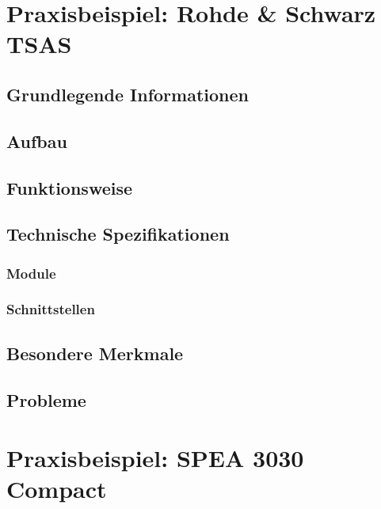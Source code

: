             
            \noindent

\section{Praxisbeispiel: Rohde \& Schwarz TSAS}

    \subsection{Grundlegende Informationen}

    \subsection{Aufbau}


    \subsection{Funktionsweise}

    \subsection{Technische Spezifikationen}

        \subsubsection{Module}

        \subsubsection{Schnittstellen}

    \subsection{Besondere Merkmale}

    \subsection{Probleme}

\section{Praxisbeispiel: SPEA 3030 Compact}

